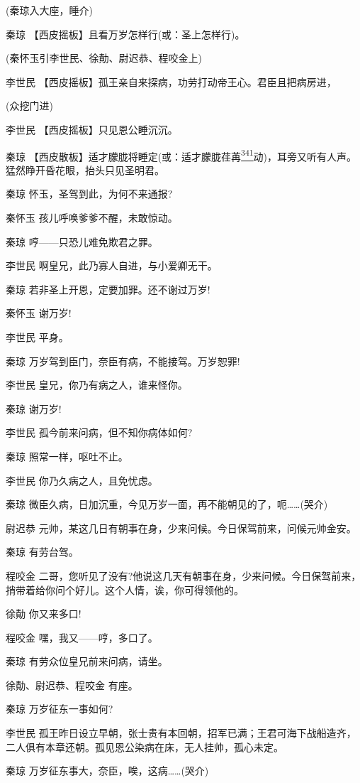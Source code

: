 (秦琼入大座，睡介)

秦琼 【西皮摇板】且看万岁怎样行(或：圣上怎样行)。

(秦怀玉引李世民、徐勣、尉迟恭、程咬金上)

李世民 【西皮摇板】孤王亲自来探病，功劳打动帝王心。君臣且把病房进，

(众挖门进)

李世民 【西皮摇板】只见恩公睡沉沉。

秦琼
【西皮散板】适才朦胧将睡定(或：适才朦胧荏苒\protect\hyperlink{fn341}{\textsuperscript{341}}动)，耳旁又听有人声。猛然睁开昏花眼，抬头只见圣明君。

秦琼 怀玉，圣驾到此，为何不来通报?

秦怀玉 孩儿呼唤爹爹不醒，未敢惊动。

秦琼 哼------只恐儿难免欺君之罪。

李世民 啊皇兄，此乃寡人自进，与小爱卿无干。

秦琼 若非圣上开恩，定要加罪。还不谢过万岁!

秦怀玉 谢万岁!

李世民 平身。

秦琼 万岁驾到臣门，奈臣有病，不能接驾。万岁恕罪!

李世民 皇兄，你乃有病之人，谁来怪你。

秦琼 谢万岁!

李世民 孤今前来问病，但不知你病体如何?

秦琼 照常一样，呕吐不止。

李世民 你乃久病之人，且免忧虑。

秦琼
微臣久病，日加沉重，今见万岁一面，再不能朝见的了，呃\ldots{}\ldots{}(哭介)

尉迟恭 元帅，某这几日有朝事在身，少来问候。今日保驾前来，问候元帅金安。

秦琼 有劳台驾。

程咬金
二哥，您听见了没有?他说这几天有朝事在身，少来问候。今日保驾前来，捎带着给你问个好儿。这个人情，诶，你可得领他的。

徐勣 你又来多口!

程咬金 嘿，我又------哼，多口了。

秦琼 有劳众位皇兄前来问病，请坐。

徐勣、尉迟恭、程咬金 有座。

秦琼 万岁征东一事如何?

李世民
孤王昨日设立早朝，张士贵有本回朝，招军已满；王君可海下战船造齐，二人俱有本章还朝。孤见恩公染病在床，无人挂帅，孤心未定。

秦琼 万岁征东事大，奈臣，唉，这病\ldots{}\ldots{}(哭介)

